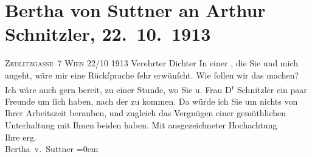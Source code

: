 

         
         \renewcommand{\erwaehntePersonen}{Personen: Olga Schnitzler}
         \renewcommand{\erwaehnteOrte}{Orte: Sternwartestraße, Wien, Zedlitzgasse}
         \renewcommand{\erwaehnteWerke}{}
               \section[Bertha von Suttner an Arthur Schnitzler, 22. 10. 1913]{ Bertha von Suttner an Arthur Schnitzler,
                    22. 10. 1913}\nopagebreak{}\rehead{ }\begin{ledgroupsized}[t]{13cm}\normalsize\beginnumbering \toendnotes[C]{\smallbreak\pagebreak[2]} 
\toendnotes[C]{\smallbreak}\pstart
           \noindent{}\centering{}{\pb}\textsc{Zedlitzgasse 7 Wien}\pend
           \pstart
           \raggedleft{}22/10 1913\pend
           \pstart{}Verehrter Dichter\pend\pstart
           In einer \label{K_L02153_1v}\label{K_L02153_1h}, die Sie und mich angeht, wäre mir eine Rückſprache ſehr erwünſcht.\pend
           \pstart
           Wie ſollen wir das machen? Ich wäre auch gern bereit, zu einer Stunde, wo Sie u.
                    Frau D\textsuperscript{r}{ }Schnitzler ein paar Freunde um ſich haben,
                    nach der \label{K_L02153_2v}\label{K_L02153_2h} zu kommen. Da {\pb}würde ich Sie
                    um nichts von Ihrer Arbeitszeit berauben, und zugleich das Vergnügen einer
                    gemüthlichen Unterhaltung mit Ihnen beiden 
                    haben.\pend
           \pstart
           Mit ausgezeichneter Hochachtung{\\[\baselineskip]}Ihre erg.{\\[\baselineskip]}\spacefill\mbox{Bertha v. Suttner}\pend
           \leftskip=0em{}
         
         \endnumbering{}\end{ledgroupsized}  \newcommand{\dateiname}{L02153}\newcommand{\titel}{Bertha von Suttner an Arthur Schnitzler, 22. 10. 1913}\newcommand{\editorInnen}{Martin Anton Müller und Gerd-Hermann Susen}
      